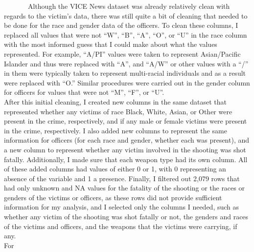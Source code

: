 \documentclass[
]{article}
\begin{document}
~~~~~~~Although the VICE News dataset was already relatively clean with
regards to the victim's data, there was still quite a bit of cleaning
that needed to be done for the race and gender data of the officers. To
clean these columns, I replaced all values that were not ``W'', ``B'',
``A'', ``O'', or ``U'' in the race column with the most informed guess
that I could make about what the values represented. For example,
``A/PI'' values were taken to represent Asian/Pacific Islander and thus
were replaced with ``A'', and ``A/W'' or other values with a ``/'' in
them were typically taken to represent multi-racial individuals and as a
result were replaced with ``O.'' Similar procedures were carried out in
the gender column for officers for values that were not ``M'', ``F'', or
``U''.\\
\hspace*{0.333em}\hspace*{0.333em}\hspace*{0.333em}\hspace*{0.333em}\hspace*{0.333em}\hspace*{0.333em}\hspace*{0.333em}After
this initial cleaning, I created new columns in the same dataset that
represented whether any victims of race Black, White, Asian, or Other
were present in the crime, respectively, and if any male or female
victims were present in the crime, respectively. I also added new
columns to represent the same information for officers (for each race
and gender, whether each was present), and a new column to represent
whether any victim involved in the shooting was shot fatally.
Additionally, I made sure that each weapon type had its own column. All
of these added columns had values of either 0 or 1, with 0 representing
an absence of the variable and 1 a presence. Finally, I filtered out
2,079 rows that had only unknown and NA values for the fatality of the
shooting or the races or genders of the victims or officers, as these
rows did not provide sufficient information for my analysis, and I
selected only the columns I needed, such as whether any victim of the
shooting was shot fatally or not, the genders and races of the victims
and officers, and the weapons that the victims were carrying, if any.\\
\hspace*{0.333em}\hspace*{0.333em}\hspace*{0.333em}\hspace*{0.333em}\hspace*{0.333em}\hspace*{0.333em}\hspace*{0.333em}For
\end{document}
